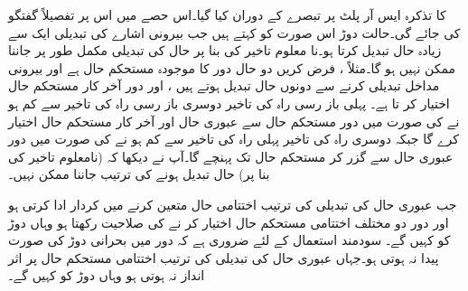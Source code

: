  کا تذکرہ ایس آر پلٹ پر تبصرے کے دوران کیا گیا۔اس حصے میں اس پر تفصیلاً گفتگو کی جائے گی۔حالت دوڑ اس صورت کو کہتے ہیں جب بیرونی اشارے کی تبدیلی ایک سے زیادہ حال تبدیل کرتا ہو۔نا معلوم تاخیر کی بنا پر حال کی تبدیلی مکمل طور پر جاننا ممکن نہیں ہو گا۔مثلاً ، فرض کریں دو حال دور کا موجودہ مستحکم حال  ہے اور بیرونی مداخل تبدیلی کرنے سے دونوں حال تبدیل ہوتے ہیں ، اور دور آخر کار  مستحکم حال اختیار کر تا ہے۔ پہلی باز رسی راہ کی تاخیر دوسری باز رسی راہ کی تاخیر سے کم ہو نے کی صورت میں دور مستحکم حال  سے عبوری حال  اور آخر کار مستحکم حال  اختیار کرے گا جبکہ دوسری راہ کی تاخیر پہلی راہ کی تاخیر سے کم ہو نے کی صورت میں دور عبوری حال  سے گزر کر مستحکم حال  تک پہنچے گا۔آپ نے دیکھا کہ (نامعلوم تاخیر کی بنا پر) حال تبدیل ہونے کی ترتیب جاننا ممکن نہیں۔

جب عبوری حال کی تبدیلی کی ترتیب اختتامی حال متعین کرنے میں کردار ادا کرتی ہو اور دور دو مختلف اختتامی مستحکم حال اختیار کر نے کی صلاحیت رکھتا ہو وہاں دوڑ کو  کہیں گے۔ سودمند استعمال کے لئے ضروری ہے کہ دور میں بحرانی دوڑ کی صورت پیدا نہ ہوتی ہو۔جہاں عبوری حال کی تبدیلی کی ترتیب اختتامی مستحکم حال پر اثر انداز نہ ہوتی ہو وہاں دوڑ کو کہیں گے۔

